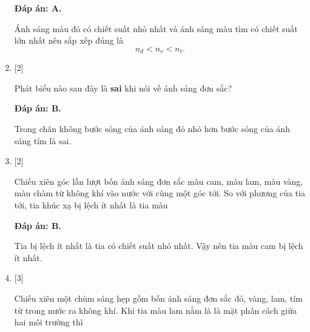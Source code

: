\begin{enumerate}[label=\bfseries Câu \arabic*:]
	\loigiai
	{		\textbf{Đáp án: A.}
		
Ánh sáng màu đỏ có chiết suất nhỏ nhất và ánh sáng màu tìm có chiết suất lớn nhất nên sắp xếp đúng là
$$
n_{d} < n_{v} < n_{t}.
$$
		
	}
	
	\item {} [2]

	\cauhoi
	{Phát biểu nào sau đây là \textbf{sai} khi nói về ánh sáng đơn sắc?
	}
	
	\loigiai
	{		\textbf{Đáp án: B.}
		
Trong chân không bước sóng của ánh sáng đỏ nhỏ hơn bước sóng của ánh sáng tím là sai.
		
	}
	
    \item {} [2]
    
	\cauhoi
	{Chiếu xiên góc lần lượt bốn ánh sáng đơn sắc màu cam, màu lam, màu vàng, màu chàm từ không khí vào nước với cùng một góc tới. So với phương của tia tới, tia khúc xạ bị lệch ít nhất là tia màu
	}
	
	\loigiai
	{		\textbf{Đáp án: B.}
		
Tia bị lệch ít nhất là tia có chiết suất nhỏ nhất. Vậy nên tia màu cam bị lệch ít nhất.
		
	}
	
    \item {} [3]
    
	\cauhoi
	{Chiếu xiên một chùm sáng hẹp gồm bốn ánh sáng đơn sắc đỏ, vàng, lam, tím từ trong nước ra không khí. Khi tia màu lam nằm là là mặt phân cách giữa hai môi trường thì
	}
	

\end{enumerate}
